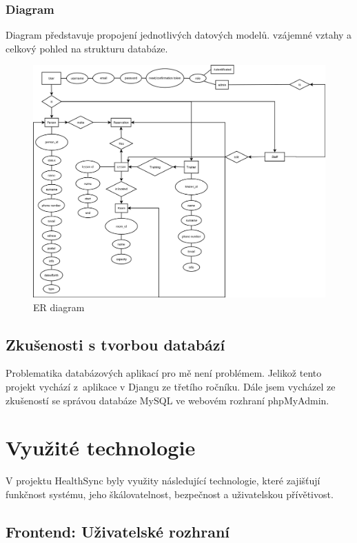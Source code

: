 \documentclass[12pt, a4paper,
openright
]{report}
\begin{document}
\subsection{Diagram}
Diagram představuje propojení jednotlivých datových modelů. vzájemné vztahy a celkový pohled na strukturu databáze.
\begin{figure}[h]
			\centering
			\includegraphics[width=1\linewidth]{image/Diagram.png} 
            \caption{ER diagram}
		\end{figure}

\section{Zkušenosti s tvorbou databází}
\label{sec:zkusenosti}

Problematika databázových aplikací pro mě není problémem. Jelikož tento projekt vychází z~aplikace v Djangu ze třetího ročníku. Dále jsem vycházel ze zkušeností se správou databáze MySQL ve webovém rozhraní phpMyAdmin.

	\chapter{Využité technologie}
	V projektu HealthSync byly využity následující technologie, které zajišťují funkčnost systému, jeho škálovatelnost, bezpečnost a uživatelskou přívětivost.
	
	
	\section{Frontend: Uživatelské rozhraní} 
    
\end{document}
